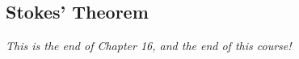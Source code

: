 \documentclass[11pt, a4paper]{MATH2023}
\begin{document}
\begin{spacing}{1.3}
    \newpage
    \section{Stokes’ Theorem}



    \vspace{\fill}
    \begin{center}
        {\it This is the end of Chapter 16, and the end of this course!}
    \end{center}

    

\end{spacing}
\end{document}

